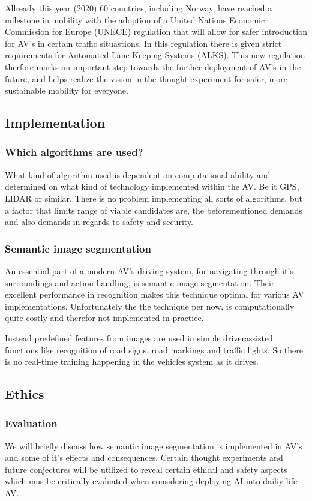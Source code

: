 \documentclass[conference]{IEEEtran}
\begin{document}
	Allready this year (2020) 60 countries, including Norway, have reached a milestone in mobility with the adoption of a United Nations Economic 
	Commission for Europe (UNECE) regulation that will allow for safer introduction for AV's in certain traffic situastions. In this regulation 
	there is given strict requirements for Automated Lane Keeping Systems (ALKS). This new regulation therfore marks an important step towards 
	the further deployment of AV's in the future, and helps realize the vision in the thought experiment for safer, more sustainable mobility for 
	everyone. \cite{UNECE:LKS}

\subsection{Implementation}	
	\subsubsection{Which algorithms are used?}
		What kind of algorithm used is dependent on computational ability and determined on what kind of technology
		implemented within the AV. Be it GPS, LIDAR or similar. There is no problem
		implementing all sorts of algorithms, but a factor that limits range of viable candidates
		are, the beforementioned demands and also demands in regards to safety and security.
	
	\subsubsection{Semantic image segmentation}
		An essential part of a modern AV's driving system, for navigating through it's surroundings 
		and action handling, is semantic image segmentation. Their excellent performance in recognition
		makes this technique optimal for various AV implementations\cite{CVPR}. Unfortunately the the technique per now,
		is computationally quite costly and therefor not implemented in practice.\cite{Bugala2018}

		Instead predefined features from images are used in simple driverassisted functions like 
		recognition of road signs, road markings and traffic lights. So there is no real-time training 
		happening in the vehicles system as it drives.

 \subsection{Ethics}
	\subsubsection{Evaluation}
		We will briefly discuss how semantic image segmentation is implemented
		in AV's and some of it's effects and consequences. Certain thought experiments and 
		future conjectures will be utilized to reveal certain ethical and safety aspects which
		mus be critically evaluated when considering deploying AI into dailiy life AV.
\end{document}
